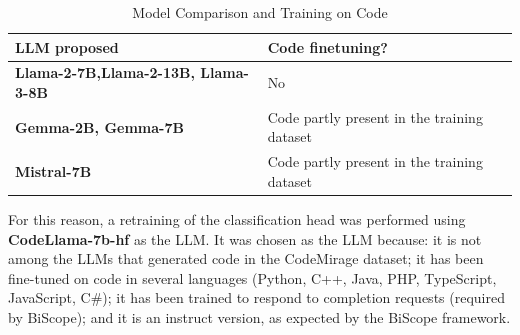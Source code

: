 \begin{table}[ht]
\centering
\begin{tabular}{|p{}|p{}|}
\hline
\textbf{LLM proposed} & \textbf{Code finetuning?}  \\
\hline
\textbf{Llama-2-7B\cite{touvron2023llama},Llama-2-13B\cite{touvron2023llama}, Llama-3-8B\cite{dubey2024llama}} & No  \\
\hline
\textbf{Gemma-2B\cite{team2024gemma}, Gemma-7B\cite{team2024gemma}} & Code partly present in the training dataset \\
\hline
\textbf{Mistral-7B\cite{jiang2023mistral}} & Code partly present in the training dataset  \\
\hline
\end{tabular}
\caption{Model Comparison and Training on Code}
\label{tab:modelli_codice}
\end{table}

For this reason, a retraining of the classification head was 
performed using \textbf{CodeLlama-7b-hf} \cite{roziere2023code} as the LLM.
It was chosen as the LLM because: it is not among the LLMs that generated 
code in the CodeMirage dataset; it has been fine-tuned on code in several 
languages (Python, C++, Java, PHP, TypeScript, JavaScript, C\#); it has been 
trained to respond to completion requests (required by BiScope); and it is an 
instruct version, as expected by the BiScope framework.

